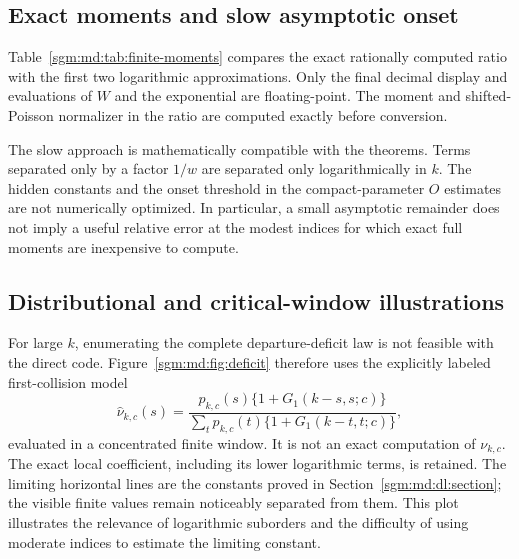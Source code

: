 \documentclass[11pt,letterpaper]{article}
\theoremstyle{remark}\newtheorem{remark}[theorem]{Remark}
\theoremstyle{definition}\newtheorem{definition}[theorem]{Definition}
\begin{document}
\subsection{Exact moments and slow asymptotic onset}

Table~\ref{sgm:md:tab:finite-moments} compares the exact rationally computed
ratio with the first two logarithmic approximations. Only the final
decimal display and evaluations of $W$ and the exponential are
floating-point. The moment and shifted-Poisson normalizer in the ratio
are computed exactly before conversion.

\begin{table}[htbp]
\centering
\caption{Finite moment diagnostics. Here
$P_1=cw^2(w+2+2c)/(2k)$ and $w=W(k/c)$. The entries show that
asymptotic accuracy can still be modest at $k=128$, especially at
larger fixed $c$. No finite-$k$ error bound is inferred from this table.}
\label{sgm:md:tab:finite-moments}
\end{table}

The slow approach is mathematically compatible with the theorems.
Terms separated only by a factor $1/w$ are separated only
logarithmically in $k$. The hidden constants and the onset threshold in
the compact-parameter $O$ estimates are not numerically optimized.
In particular, a small asymptotic remainder does not imply a useful
relative error at the modest indices for which exact full moments
are inexpensive to compute.

\subsection{Distributional and critical-window illustrations}

For large $k$, enumerating the complete departure-deficit law is not
feasible with the direct code. Figure~\ref{sgm:md:fig:deficit} therefore uses
the explicitly labeled first-collision model
\begin{equation}\label{sgm:md:num:first-model}
 \widehat\nu_{k,c}(s)=
 \frac{p_{k,c}(s)\{1+G_1(k-s,s;c)\}}
      {\sum_t p_{k,c}(t)\{1+G_1(k-t,t;c)\}},
\end{equation}
evaluated in a concentrated finite window. It is not an exact
computation of $\nu_{k,c}$. The exact local coefficient, including its
lower logarithmic terms, is retained. The limiting horizontal lines
are the constants proved in Section~\ref{sgm:md:dl:section}; the visible
finite values remain noticeably separated from them. This plot
illustrates the relevance of logarithmic suborders and the difficulty
of using moderate indices to estimate the limiting constant.
\end{document}
